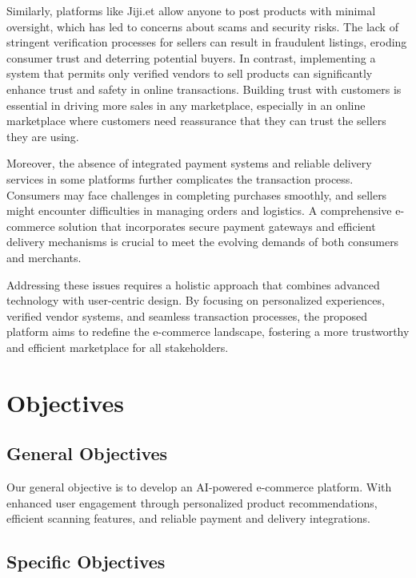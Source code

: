\documentclass[12pt]{report}
\begin{document}
Similarly, platforms like Jiji.et allow anyone to post products with minimal oversight, which
has led to concerns about scams and security risks. The lack of stringent verification
processes for sellers can result in fraudulent listings, eroding consumer trust and deterring
potential buyers. In contrast, implementing a system that permits only verified vendors to sell
products can significantly enhance trust and safety in online transactions. Building trust with
customers is essential in driving more sales in any marketplace, especially in an online
marketplace where customers need reassurance that they can trust the sellers they are using. \cite{c7}

Moreover, the absence of integrated payment systems and reliable delivery services in some
platforms further complicates the transaction process. Consumers may face challenges in
completing purchases smoothly, and sellers might encounter difficulties in managing orders
and logistics. A comprehensive e-commerce solution that incorporates secure payment
gateways and efficient delivery mechanisms is crucial to meet the evolving demands of both
consumers and merchants.

Addressing these issues requires a holistic approach that combines advanced technology with
user-centric design. By focusing on personalized experiences, verified vendor systems, and
seamless transaction processes, the proposed platform aims to redefine the e-commerce
landscape, fostering a more trustworthy and efficient marketplace for all stakeholders.

\section{Objectives}

\subsection{General Objectives}

Our general objective is to develop an AI-powered e-commerce platform. With enhanced user
engagement through personalized product recommendations, efficient scanning features, and
reliable payment and delivery integrations.

\subsection{Specific Objectives}
\end{document}
